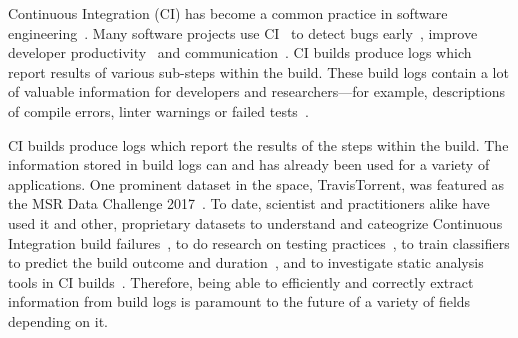 





Continuous Integration (CI) has become a common practice in software
engineering~\cite{hilton2016usage}.  Many software projects use
CI~\cite{hilton2016usage,staahl2014modeling,beller2017oops} to detect
bugs early~\cite{vasilescu2015quality,duvall2007continuous}, improve
developer productivity~\cite{miller2008hundred,hilton2016usage} and
communication~\cite{downs2012ambient}.  CI builds produce logs which
report results of various sub-steps within the build.  These build logs
contain a lot of valuable information for developers and researchers---for
example, descriptions of compile errors, linter warnings or failed
tests~\cite{beller2017oops,seo2014programmers,vassallo2017a-tale}.

CI builds produce logs which report the results of the steps within the build.
The information stored in build logs can and has
already been used for a variety of applications. One prominent dataset
in the space, TravisTorrent, was featured as the MSR Data Challenge
2017~\cite{msr17challenge}. To date, scientist and practitioners alike
have used it and other, proprietary datasets to understand and
cateogrize Continuous Integration build
failures~\cite{islam2017insights}, to do research on testing
practices~\cite{orellana2017differences}, to train classifiers to
predict the build outcome and
duration~\cite{ni2017cost,bisong2017built,machalica2019predictive},
and to investigate static analysis tools in CI
builds~\cite{zampetti2017open}. Therefore, being able to efficiently
and correctly extract information from build logs is paramount to the
future of a variety of fields depending on it.

